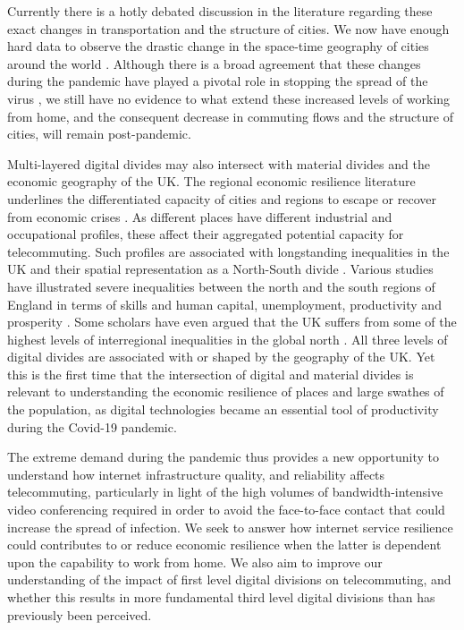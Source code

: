 \documentclass[]{interact}
\theoremstyle{plain}%
\theoremstyle{definition}
\theoremstyle{remark}
\begin{document}
Currently there is a hotly debated discussion in the literature
regarding these exact changes in transportation and the structure of
cities. We now have enough hard data to observe the drastic change in
the space-time geography of cities around the world
\citep[e.g.~][]{google2020, shibayama2021impact}. Although there is a
broad agreement that these changes during the pandemic have played a
pivotal role in stopping the spread of the virus
\citep{jia2020population, yang2020taking, mu2020interplay}, we still
have no evidence to what extend these increased levels of working from
home, and the consequent decrease in commuting flows and the structure
of cities, will remain post-pandemic.

Multi-layered digital divides may also intersect with material divides
and the economic geography of the UK. The regional economic resilience
literature underlines the differentiated capacity of cities and regions
to escape or recover from economic crises
\citep{martin2012regional, kitsos2018economic}. As different places have
different industrial and occupational profiles, these affect their
aggregated potential capacity for telecommuting. Such profiles are
associated with longstanding inequalities in the UK and their spatial
representation as a North-South divide \citep{martin_north_south}.
Various studies have illustrated severe inequalities between the north
and the south regions of England in terms of skills and human capital,
unemployment, productivity and prosperity
\citep{lee2014grim, mccann2020perceptions, dorling2018peak}. Some
scholars have even argued that the UK suffers from some of the highest
levels of interregional inequalities in the global north
\citep{gal2018reducing, mccann2016uk}. All three levels of digital
divides are associated with or shaped by the geography of the UK. Yet
this is the first time that the intersection of digital and material
divides is relevant to understanding the economic resilience of places
and large swathes of the population, as digital technologies became an
essential tool of productivity during the Covid-19 pandemic.

The extreme demand during the pandemic thus provides a new opportunity
to understand how internet infrastructure quality, and reliability
affects telecommuting, particularly in light of the high volumes of
bandwidth-intensive video conferencing required in order to avoid the
face-to-face contact that could increase the spread of infection. We
seek to answer how internet service resilience could contributes to or
reduce economic resilience when the latter is dependent upon the
capability to work from home. We also aim to improve our understanding
of the impact of first level digital divisions on telecommuting, and
whether this results in more fundamental third level digital divisions
than has previously been perceived.
\end{document}

